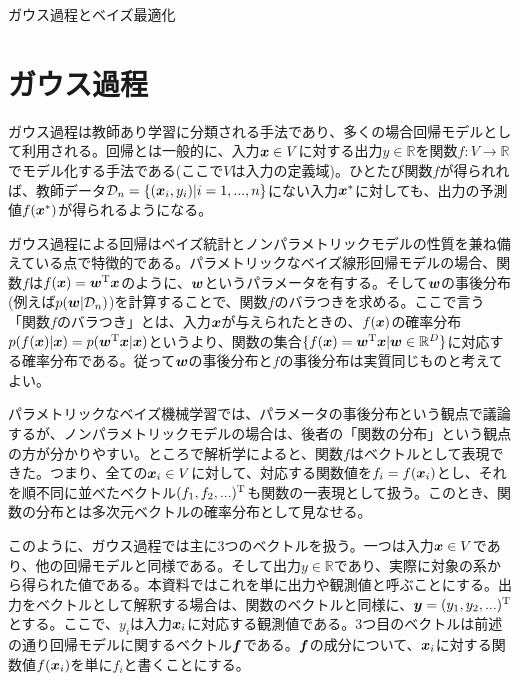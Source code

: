 \documentclass[dvipdfmx, 9pt, a4paper]{jsarticle}
\numberwithin{equation}{section}
\newcommand{\bm}[1]{{\mbox{\boldmath $#1$}}}
\begin{document}
\begin{center}
{\fontsize{18pt}{1pt}\selectfont ガウス過程とベイズ最適化}\\
\end{center}

\section{ガウス過程}
ガウス過程は教師あり学習に分類される手法であり、多くの場合回帰モデルとして利用される。回帰とは一般的に、入力$\bm x \in V$に対する出力$y \in \mathbb{R}$を関数$f:V \to \mathbb{R}$でモデル化する手法である(ここで$V$は入力の定義域)。ひとたび関数$f$が得られれば、教師データ$\mathcal{D}_n=\{(\bm x_i, y_i)|i=1, ..., n\}$にない入力$\bm x^*$に対しても、出力の予測値$f(\bm x^*)$が得られるようになる。\par
ガウス過程による回帰はベイズ統計とノンパラメトリックモデルの性質を兼ね備えている点で特徴的である。パラメトリックなベイズ線形回帰モデルの場合、関数$f$は$f(\bm x)=\bm w^{\rm T}\bm x$のように、$\bm w$というパラメータを有する。そして$\bm w$の事後分布(例えば$p(\bm w|\mathcal{D}_n)$)を計算することで、関数$f$のバラつきを求める。ここで言う「関数$f$のバラつき」とは、入力$\bm x$が与えられたときの、$f(\bm x)$の確率分布$p(f(\bm x)|\bm x)=p(\bm w^{\rm T}\bm x|\bm x)$というより、関数の集合$\{f(\bm x) = \bm w^{\rm T}\bm x|\bm w \in \mathbb{R}^D\}$に対応する確率分布である。従って$\bm w$の事後分布と$f$の事後分布は実質同じものと考えてよい。\par
パラメトリックなベイズ機械学習では、パラメータの事後分布という観点で議論するが、ノンパラメトリックモデルの場合は、後者の「関数の分布」という観点の方が分かりやすい。ところで解析学によると、関数$f$はベクトルとして表現できた。つまり、全ての$\bm x_i \in V$に対して、対応する関数値を$f_i=f(\bm x_i)$とし、それを順不同に並べたベクトル$(f_1, f_2, ...)^{\rm T}$も関数の一表現として扱う。このとき、関数の分布とは多次元ベクトルの確率分布として見なせる。\par
このように、ガウス過程では主に3つのベクトルを扱う。一つは入力$\bm x \in V$であり、他の回帰モデルと同様である。そして出力$y \in \mathbb{R}$であり、実際に対象の系から得られた値である。本資料ではこれを単に出力や観測値と呼ぶことにする。出力をベクトルとして解釈する場合は、関数のベクトルと同様に、$\bm y=(y_1, y_2, ...)^{\rm T}$とする。ここで、$y_i$は入力$\bm x_i$に対応する観測値である。3つ目のベクトルは前述の通り回帰モデルに関するベクトル$\bm f$である。$\bm f$の成分について、$\bm x_i$に対する関数値$f(\bm x_i)$を単に$f_i$と書くことにする。
\end{document}
